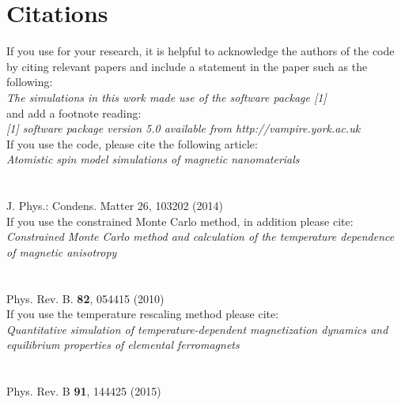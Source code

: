 \section*{Citations}
If you use \vampire for your research, it is helpful to acknowledge the authors of the code by citing relevant papers and include a statement in the paper such as the following:\\
\vspace{0.4cm}
\indent \textit{The simulations in this work made use of the \vampire software package [1]}\\
\vspace{0.2cm}
and add a footnote reading:\\
\vspace{0.2cm}
\indent \textit{[1] \vampire software package version 5.0 available from http://vampire.york.ac.uk}\\
\vspace{0.4cm}
\noindent If you use the code, please cite the following article:\\
\noindent \textit{\small Atomistic spin model simulations of magnetic nanomaterials}\\
\vspace{-0.4cm}\\
\\
{\small J. Phys.: Condens. Matter 26, 103202 (2014)}\\

\clearpage
\noindent If you use the constrained Monte Carlo method, in addition please cite:\\

\noindent \textit{\small Constrained Monte Carlo method and calculation of the temperature dependence of magnetic anisotropy}\\
\vspace{-0.4cm}\\
\\
{\small Phys. Rev. B. \textbf{82}, 054415 (2010)}\\

\noindent If you use the temperature rescaling method please cite:\\

\noindent \textit{\small Quantitative simulation of temperature-dependent magnetization dynamics and equilibrium properties of elemental ferromagnets}\\
\vspace{-0.4cm}\\
\\
{\small Phys. Rev. B \textbf{91}, 144425 (2015)}

